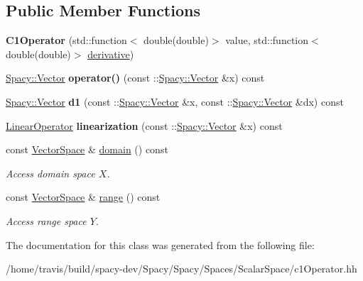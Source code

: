 \subsection*{Public Member Functions}
\begin{DoxyCompactItemize}
\item 
\hypertarget{classSpacy_1_1Scalar_1_1C1Operator_a97f719a6349064072c892972663e70c7}{{\bfseries C1\-Operator} (std\-::function$<$ double(double)$>$ value, std\-::function$<$ double(double)$>$ \hyperlink{namespaceSpacy_a002fe344fa6d04a6ac59a74ea25fddb6}{derivative})}\label{classSpacy_1_1Scalar_1_1C1Operator_a97f719a6349064072c892972663e70c7}

\item 
\hypertarget{classSpacy_1_1Scalar_1_1C1Operator_a9ab2d8a905a70dd848c984e532b50fed}{\hyperlink{classSpacy_1_1Vector}{Spacy\-::\-Vector} {\bfseries operator()} (const \-::\hyperlink{classSpacy_1_1Vector}{Spacy\-::\-Vector} \&x) const }\label{classSpacy_1_1Scalar_1_1C1Operator_a9ab2d8a905a70dd848c984e532b50fed}

\item 
\hypertarget{classSpacy_1_1Scalar_1_1C1Operator_a56908ac8a9cd1e959f15e3f71a00a01b}{\hyperlink{classSpacy_1_1Vector}{Spacy\-::\-Vector} {\bfseries d1} (const \-::\hyperlink{classSpacy_1_1Vector}{Spacy\-::\-Vector} \&x, const \-::\hyperlink{classSpacy_1_1Vector}{Spacy\-::\-Vector} \&dx) const }\label{classSpacy_1_1Scalar_1_1C1Operator_a56908ac8a9cd1e959f15e3f71a00a01b}

\item 
\hypertarget{classSpacy_1_1Scalar_1_1C1Operator_acefccd4cac61750dad6053a963b10944}{\hyperlink{structSpacy_1_1Scalar_1_1LinearOperator}{Linear\-Operator} {\bfseries linearization} (const \-::\hyperlink{classSpacy_1_1Vector}{Spacy\-::\-Vector} \&x) const }\label{classSpacy_1_1Scalar_1_1C1Operator_acefccd4cac61750dad6053a963b10944}

\item 
\hypertarget{classSpacy_1_1OperatorBase_a2588f9b3e0188820c4c494e63293dc6f}{const \hyperlink{classSpacy_1_1VectorSpace}{Vector\-Space} \& \hyperlink{classSpacy_1_1OperatorBase_a2588f9b3e0188820c4c494e63293dc6f}{domain} () const }\label{classSpacy_1_1OperatorBase_a2588f9b3e0188820c4c494e63293dc6f}

\begin{DoxyCompactList}\small\item\em Access domain space $X$. \end{DoxyCompactList}\item 
\hypertarget{classSpacy_1_1OperatorBase_ab19d3b7a6f290b1079248f1e567e53d6}{const \hyperlink{classSpacy_1_1VectorSpace}{Vector\-Space} \& \hyperlink{classSpacy_1_1OperatorBase_ab19d3b7a6f290b1079248f1e567e53d6}{range} () const }\label{classSpacy_1_1OperatorBase_ab19d3b7a6f290b1079248f1e567e53d6}

\begin{DoxyCompactList}\small\item\em Access range space $Y$. \end{DoxyCompactList}\end{DoxyCompactItemize}


The documentation for this class was generated from the following file\-:\begin{DoxyCompactItemize}
\item 
/home/travis/build/spacy-\/dev/\-Spacy/\-Spacy/\-Spaces/\-Scalar\-Space/c1\-Operator.\-hh\end{DoxyCompactItemize}
